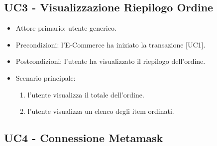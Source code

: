 \subsection{UC3 - Visualizzazione Riepilogo Ordine}

\begin{itemize}
    \item Attore primario: utente generico.
    \item Precondizioni: l'E-Commerce ha iniziato la transazione [UC1].
    \item Postcondizioni: l'utente ha visualizzato il riepilogo dell'ordine.
    \item Scenario principale: \begin{enumerate}
        \item l'utente visualizza il totale dell'ordine.
        \item l'utente visualizza un elenco degli item ordinati.
    \end{enumerate}
\end{itemize}

\subsection{UC4 - Connessione Metamask}

